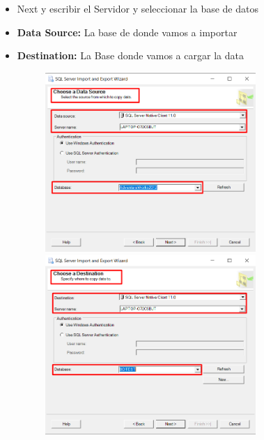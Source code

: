 \documentclass[12pt,letterpaper]{article}
\begin{document}
\begin{itemize}
\begin{figure}[htb]
\begin{center}
		\end{center}
	\end{figure}

\newpage

\item Next y escribir el Servidor y seleccionar la base de datos
\item \textbf{Data Source:} La base de donde vamos a importar
\item \textbf{Destination:} La Base donde vamos a cargar la data
	\begin{figure}[htb]
		\begin{center}
			\includegraphics[width=8cm]{./IMAGENES/Tarea1_3}
			\includegraphics[width=8cm]{./IMAGENES/Tarea1_4}
		\end{center}
	\end{figure}


\end{itemize}
\end{document}
